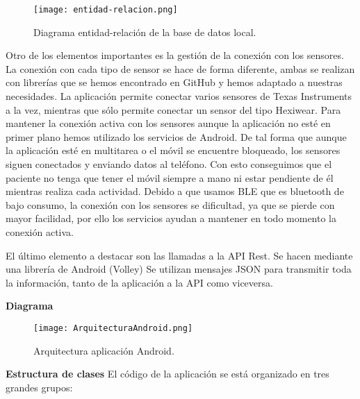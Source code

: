 \documentclass[11pt,spanish]{article}
\begin{document}
\begin{figure}[h!]
\centering
\texttt{[image: entidad-relacion.png]}
\caption{Diagrama entidad-relación de la base de datos local.}
\end{figure}

Otro de los elementos importantes es la gestión de la conexión con los sensores. La conexión con cada tipo de sensor se hace de forma diferente, ambas se realizan con librerías que se hemos encontrado en GitHub y hemos adaptado a nuestras necesidades. La aplicación permite conectar varios sensores de Texas Instruments a la vez, mientras que sólo permite conectar un sensor del tipo Hexiwear. Para mantener la conexión activa con los sensores aunque la aplicación no esté en primer plano hemos utilizado los servicios de Android. De tal forma que aunque la aplicación esté en multitarea o el móvil se encuentre bloqueado, los sensores siguen conectados y enviando datos al teléfono. Con esto conseguimos que el paciente no tenga que tener el móvil siempre a mano ni estar pendiente de él mientras realiza cada actividad. Debido a que usamos BLE que es bluetooth de bajo consumo, la conexión con los sensores se dificultad, ya que se pierde con mayor facilidad, por ello los servicios ayudan a mantener en todo momento la conexión activa.
\newline

El último elemento a destacar son las llamadas a la API Rest. Se hacen mediante una librería de Android (Volley) Se utilizan mensajes JSON para transmitir toda la información, tanto de la aplicación a la API como viceversa.
\newline

{\bf Diagrama}
\begin{figure}[h!]
  \centering
  \texttt{[image: ArquitecturaAndroid.png]}
  \caption{Arquitectura aplicación Android.}
\end{figure}

{\bf Estructura de clases}
\newline
\newline
El código de la aplicación se está organizado en tres grandes grupos:
\end{document}
